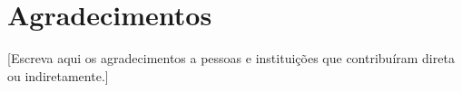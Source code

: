 \section*{Agradecimentos}

[Escreva aqui os agradecimentos a pessoas e instituições que contribuíram direta ou indiretamente.]

